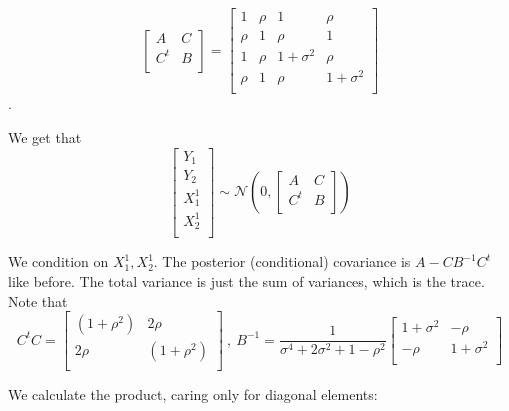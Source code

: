 \documentclass[paper=a4, fontsize=11pt]{scrartcl} %
\numberwithin{equation}{section} %
\numberwithin{figure}{section} %
\numberwithin{table}{section} %
\newcommand{\sig}{\sigma^2}
\newcommand{\nn}{\mathcal{N}}
\begin{document}
\[
\begin{bmatrix}
 A   & C    \\
 C^t & B    \\
\end{bmatrix}
= 
\begin{bmatrix}   
1      &   \rho   &   1      &   \rho    \\
\rho   &   1      &   \rho   &   1       \\ 
1      &   \rho   &   1+\sig &   \rho    \\
\rho   &   1      &   \rho   &   1+\sig  \\
\end{bmatrix}
\].

We get that
\[
\begin{bmatrix}
 Y_1    \\
  Y_2   \\
  X_1^1 \\
  X_2^1 \\
\end{bmatrix}
\sim \nn \left ( 0 , 
\begin{bmatrix}   
A      &   C       \\
C^t    &   B    \\ 
\end{bmatrix}
\right )
\]



We condition on $X_1^1 , X_2^1$. The posterior (conditional) covariance is $A - CB^{-1}C^t$ like before. The 
total variance is just the sum of variances, which is the trace. Note that
\[
C^tC = 
\begin{bmatrix}   
 (1 +\rho^2)    &   2\rho  \\
 2\rho          &   (1 +\rho^2) \\ 
\end{bmatrix} 
\ , \
B^{-1}
= \frac{1}{ \sigma^4 + 2\sig + 1 -\rho^2 }
\begin{bmatrix}   
 1+\sig &   -\rho        \\
 -\rho      &   1+\sig   \\
\end{bmatrix}
\]

We calculate the product, caring only for diagonal elements:
\end{document}
